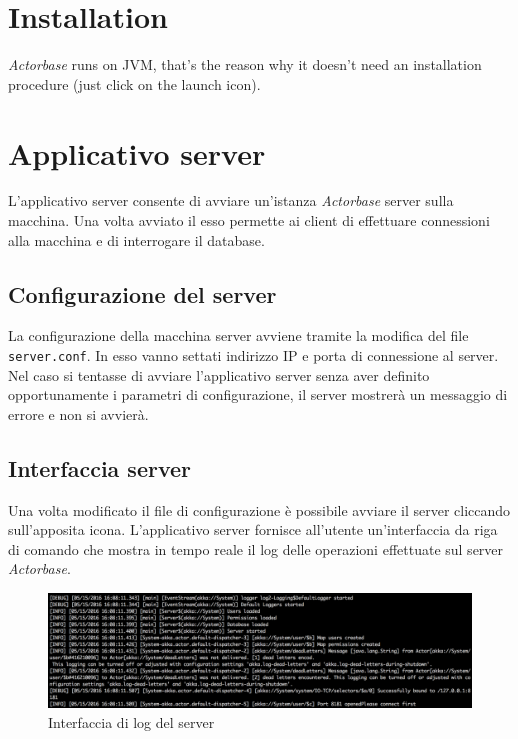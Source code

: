 \documentclass[a4paper]{article}
\begin{document}
	\section{Installation}
	\emph{Actorbase} runs on JVM, that's the reason why it doesn't need an installation procedure (just click on the launch icon). 
	\newpage



	\section{Applicativo server}
	L'applicativo server consente di avviare un'istanza \emph{Actorbase} server sulla macchina. Una volta avviato il esso permette ai client di effettuare connessioni alla macchina e di interrogare il database. 
	
	\subsection{Configurazione del server}
	La configurazione della macchina server avviene tramite la modifica del file \texttt{server.conf}. In esso vanno settati indirizzo IP e porta di connessione al server.
	\\
	Nel caso si tentasse di avviare l'applicativo server senza aver definito opportunamente i parametri di configurazione, il server mostrerà un messaggio di errore e non si avvierà.
	
	\subsection{Interfaccia server}
	Una volta modificato il file di configurazione è possibile avviare il server cliccando sull'apposita icona. L'applicativo server fornisce all'utente un'interfaccia da riga di comando che mostra in tempo reale il log delle operazioni effettuate sul server \emph{Actorbase}.  
	\begin{figure}[H]
		\centering
		\includegraphics[width=\textwidth]{logServer.png}
		\caption{Interfaccia di log del server}
	\end{figure}
	\newpage
	
\end{document}
